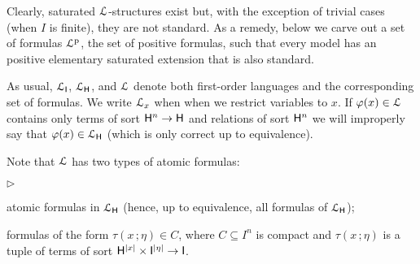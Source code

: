 \documentclass[10pt,oneside]{amsproc}
\newcommand{\mylabel}[1]{{#1}\hfill}
\renewenvironment{itemize}
  {\begin{list}{$\triangleright$}{%
  \setlength{\parskip}{0mm}
  \setlength{\topsep}{.4\baselineskip}
  \setlength{\rightmargin}{0mm}
  \setlength{\listparindent}{0mm}
  \setlength{\itemindent}{0mm}
  \setlength{\labelwidth}{3ex}
  \setlength{\itemsep}{.2\baselineskip}
  \setlength{\parsep}{.2\baselineskip}
  \setlength{\partopsep}{0mm}
  \setlength{\labelsep}{1ex}
  \setlength{\leftmargin}{\labelwidth+\labelsep}
  \let\makelabel\mylabel}}{%
\end{list}}
\begin{document}

Clearly, saturated ${\EuScript L}$-structures exist but, with the exception of trivial cases (when $I$ is finite), they are not standard.
As a remedy, below we carve out a set of formulas ${\EuScript L}^{\rm p}$, the set of positive formulas, such that every model has an positive elementary saturated extension that is also standard.

As usual, ${\EuScript L}_{\sf I}$, ${\EuScript L}_{\sf H}$, and ${\EuScript L}$ denote both first-order languages and the corresponding set of formulas.
We write ${\EuScript L}_x$ when when we restrict variables to $x$.
If $\varphi(x)\in{\EuScript L}$ contains only terms of sort ${\sf H}^n\to{\sf H}$ and relations of sort ${\sf H}^n$ we will improperly say that $\varphi(x)\in {\EuScript L}_{\sf H}$ (which is only correct up to equivalence).

Note that ${\EuScript L}$ has two types of atomic formulas: 
\begin{itemize}
  \item[1.] atomic formulas in ${\EuScript L}_{\sf H}$ (hence, up to equivalence, all formulas of ${\EuScript L}_{\sf H}$);
  \item[2.] formulas of the form $\tau(x\,;\eta)\in C$, where $C\subseteq I^n$ is compact and $\tau(x\,;\eta)$ is a tuple of terms of sort ${\sf H}^{|x|}\times {\sf I}^{|\eta|}\to {\sf I}$.
\end{itemize}
\end{document}
